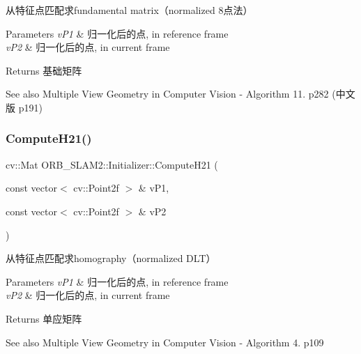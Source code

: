 从特征点匹配求fundamental matrix（normalized 8点法） 


\begin{DoxyParams}{Parameters}
{\em v\+P1} & 归一化后的点, in reference frame \\
\hline
{\em v\+P2} & 归一化后的点, in current frame \\
\hline
\end{DoxyParams}
\begin{DoxyReturn}{Returns}
基础矩阵 
\end{DoxyReturn}
\begin{DoxySeeAlso}{See also}
Multiple View Geometry in Computer Vision -\/ Algorithm 11. p282 (中文版 p191) 
\end{DoxySeeAlso}
\mbox{\label{class_o_r_b___s_l_a_m2_1_1_initializer_a16d5aa375ed03336cc0dc981861b15da}} 
\subsubsection{\texorpdfstring{Compute\+H21()}{ComputeH21()}}
{\footnotesize\ttfamily cv\+::\+Mat O\+R\+B\+\_\+\+S\+L\+A\+M2\+::\+Initializer\+::\+Compute\+H21 (\begin{DoxyParamCaption}\item[{const vector$<$ cv\+::\+Point2f $>$ \&}]{v\+P1,  }\item[{const vector$<$ cv\+::\+Point2f $>$ \&}]{v\+P2 }\end{DoxyParamCaption})\hspace{0.3cm}{\ttfamily [private]}}



从特征点匹配求homography（normalized D\+L\+T） 


\begin{DoxyParams}{Parameters}
{\em v\+P1} & 归一化后的点, in reference frame \\
\hline
{\em v\+P2} & 归一化后的点, in current frame \\
\hline
\end{DoxyParams}
\begin{DoxyReturn}{Returns}
单应矩阵 
\end{DoxyReturn}
\begin{DoxySeeAlso}{See also}
Multiple View Geometry in Computer Vision -\/ Algorithm 4. p109 
\end{DoxySeeAlso}
\mbox{\label{class_o_r_b___s_l_a_m2_1_1_initializer_a78e9e1a14ee76f6cab0f734fa95793af}} 
